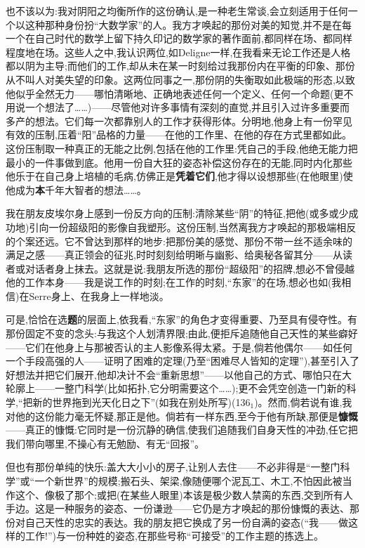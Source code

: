 也不该以为:我对阴阳之均衡所作的这份确认,是一种老生常谈,会立刻适用于任何一个以这种那种身份扮“大数学家”的人。我方才唤起的那份对美的知觉,并不是在每一个在自己时代的数学上留下持久印记的数学家的著作面前,都同样在场、都同样程度地在场。这些人之中,我认识两位,如Deligne一样,在我看来无论工作还是人格都以阴为主导;而他们的工作,却从未在某一时刻给过我那份内在平衡的印象、那份从不叫人对美失望的印象。这两位同事之一,那份阴的失衡取如此极端的形态,以致他似乎全然无力——哪怕清晰地、正确地表述任何一个定义、任何一个命题(更不用说一个想法了……)——尽管他对许多事情有深刻的直觉,并且引入过许多重要而多产的想法。它们每一次都靠别人的工作才获得形体。分明地,他身上有一份罕见有效的压制,压着“阳”品格的力量——在他的工作里、在他的存在方式里都如此。这份压制取一种真正的无能之比例,包括在他的工作里:凭自己的手段,他绝无能力把最小的一件事做到底。他用一份自大狂的姿态补偿这份存在的无能,同时内化那些他乐于在自己身上培植的毛病,仿佛正是\textbf{凭着它们}\dmark{},他才得以设想那些(在他眼里)使他成为\textbf{本}千年大智者的想法……。

我在朋友皮埃尔身上感到一份反方向的压制:清除某些“阴”的特征,把他(或多或少成功地)引向一份超级阳的影像自我塑形。这份压制,当然离我方才唤起的那极端相反的个案还远。它不曾达到那样的地步:把那份美的感觉、那份不带一丝不适余味的满足之感——真正领会的征兆,时时刻刻给明晰与幽影、给奥秘各留其分——从读者或对话者身上抹去。这就是说:我朋友所选的那份“超级阳”的招牌,想必不曾侵越他的工作本身——我是说工作的时刻;在工作的时刻,“东家”的在场,想必也如(我相信)在Serre身上、在我身上一样地淡。

可是,恰恰在选\textbf{题}的层面上,依我看,“东家”的角色才变得重要、乃至具有侵夺性。有那份固定不变的念头:与我这个人划清界限;由此,便拒斥追随他自己天性的某些癖好——它们在他身上与那被否认的主人影像系得太紧。于是,倘若他偶尔——如任何一个手段高强的人——证明了困难的定理(乃至“困难尽人皆知的定理”),甚至引入了好想法并把它们展开,他却决计不会“重新思想”——以他自己的方式、哪怕只在大轮廓上——一整门科学(比如拓扑,它分明需要这个……);更不会凭空创造一门新的科学,“把新的世界拖到光天化日之下”(如我在别处所写)(136$_{1}$)。然而,倘若说有谁,我对他的这份能力毫无怀疑,那正是他。倘若有一样东西,至今于他有所缺,那便是\textbf{慷慨}——真正的慷慨:它同时是一份沉静的确信,使我们追随我们自身天性的冲劲,任它把我们带向哪里,不操心有无勉励、有无“回报”\dmark{}。

但也有那份单纯的快乐:盖大大小小的房子,让别人去住——不必非得是“一整门科学”或“一个新世界”的规模;搬石头、架梁,像随便哪个泥瓦工、木工,不怕因此被当作这个、像极了那个;或把(在某些人眼里)本该是极少数人禁脔的东西,交到所有人手边。这是一种服务的姿态、一份谦逊——它仍是方才唤起的那份慷慨的表达、那份对自己天性的忠实的表达。我的朋友把它换成了另一份自满的姿态(“我——做这样的工作!”)与一份种姓的姿态,在那些号称“可接受”的工作主题的拣选上。

